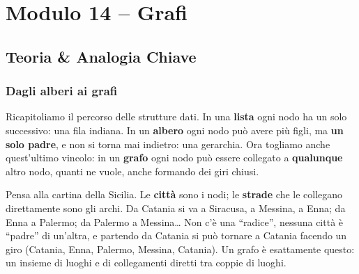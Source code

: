 \chapter{Modulo 14 -- Grafi}


\section{Teoria \& Analogia Chiave}

\subsection*{Dagli alberi ai grafi}

Ricapitoliamo il percorso delle strutture dati. In una \textbf{lista} ogni nodo ha un
solo successivo: una fila indiana. In un \textbf{albero} ogni nodo può avere più figli,
ma \textbf{un solo padre}, e non si torna mai indietro: una gerarchia. Ora togliamo
anche quest'ultimo vincolo: in un \textbf{grafo} ogni nodo può essere collegato a
\textbf{qualunque} altro nodo, quanti ne vuole, anche formando dei giri chiusi.

\begin{analogia}
Pensa alla cartina della Sicilia. Le \textbf{città} sono i nodi; le \textbf{strade} che
le collegano direttamente sono gli archi. Da Catania si va a Siracusa, a Messina, a
Enna; da Enna a Palermo; da Palermo a Messina\ldots{} Non c'è una ``radice'', nessuna
città è ``padre'' di un'altra, e partendo da Catania si può tornare a Catania facendo un
giro (Catania, Enna, Palermo, Messina, Catania). Un grafo è esattamente questo: un
insieme di luoghi e di collegamenti diretti tra coppie di luoghi.
\end{analogia}

